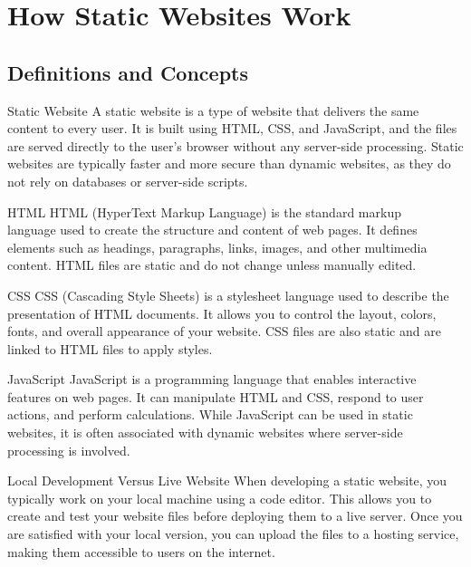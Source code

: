 
\newpage
\section{How Static Websites Work}

\subsection{Definitions and Concepts}
\begin{definition}{Static Website}
A static website is a type of website that delivers the same content to every user. It is built using HTML, CSS, and JavaScript, and the files are served directly to the user's browser without any server-side processing. Static websites are typically faster and more secure than dynamic websites, as they do not rely on databases or server-side scripts.
\end{definition}

\begin{definition}{HTML}
HTML (HyperText Markup Language) is the standard markup \\ language used to create the structure and content of web pages. It defines elements such as headings, paragraphs, links, images, and other multimedia content. HTML files are static and do not change unless manually edited.%
\end{definition}

\begin{definition}{CSS}
CSS (Cascading Style Sheets) is a stylesheet language used to describe the presentation of HTML documents. It allows you to control the layout, colors, fonts, and overall appearance of your website. CSS files are also static and are linked to HTML files to apply styles.
\end{definition}

\begin{definition}{JavaScript}
JavaScript is a programming language that enables interactive features on web pages. It can manipulate HTML and CSS, respond to user actions, and perform calculations. While JavaScript can be used in static websites, it is often associated with dynamic websites where server-side processing is involved.
\end{definition}

\begin{concept}{Local Development Versus Live Website}
When developing a static website, you typically work on your local machine using a code editor. This allows you to create and test your website files before deploying them to a live server. Once you are satisfied with your local version, you can upload the files to a hosting service, making them accessible to users on the internet.
\end{concept}

